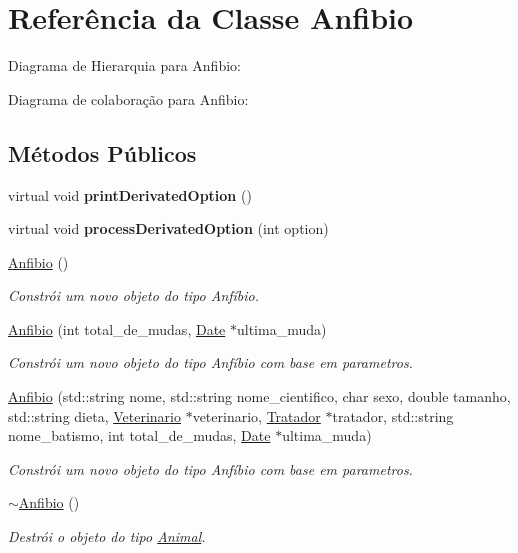 \hypertarget{classAnfibio}{}\section{Referência da Classe Anfibio}
\label{classAnfibio}


Diagrama de Hierarquia para Anfibio\+:


Diagrama de colaboração para Anfibio\+:
\subsection*{Métodos Públicos}
\begin{DoxyCompactItemize}
\item 
\mbox{\label{classAnfibio_a4d20140ce2e935fb8ac608b2c2004f3f}} 
virtual void {\bfseries print\+Derivated\+Option} ()
\item 
\mbox{\label{classAnfibio_af29dedd2429e4773b73bd01d29b33609}} 
virtual void {\bfseries process\+Derivated\+Option} (int option)
\item 
\mbox{\label{classAnfibio_a91fd9b91b9124ab41ea9e9c9bb013476}} 
\hyperlink{classAnfibio_a91fd9b91b9124ab41ea9e9c9bb013476}{Anfibio} ()
\begin{DoxyCompactList}\small\item\em Constrói um novo objeto do tipo Anfíbio. \end{DoxyCompactList}\item 
\hyperlink{classAnfibio_a488a2d9bfe450ebd8f0a19c5ec4eea32}{Anfibio} (int total\+\_\+de\+\_\+mudas, \hyperlink{classDate}{Date} $\ast$ultima\+\_\+muda)
\begin{DoxyCompactList}\small\item\em Constrói um novo objeto do tipo Anfíbio com base em parametros. \end{DoxyCompactList}\item 
\hyperlink{classAnfibio_a8b72864faa207bd6e39c29bfc8559c02}{Anfibio} (std\+::string nome, std\+::string nome\+\_\+cientifico, char sexo, double tamanho, std\+::string dieta, \hyperlink{classVeterinario}{Veterinario} $\ast$veterinario, \hyperlink{classTratador}{Tratador} $\ast$tratador, std\+::string nome\+\_\+batismo, int total\+\_\+de\+\_\+mudas, \hyperlink{classDate}{Date} $\ast$ultima\+\_\+muda)
\begin{DoxyCompactList}\small\item\em Constrói um novo objeto do tipo Anfíbio com base em parametros. \end{DoxyCompactList}\item 
\mbox{\label{classAnfibio_a53bb71a1ed0e79c5fc41a62a0af9060c}} 
\hyperlink{classAnfibio_a53bb71a1ed0e79c5fc41a62a0af9060c}{$\sim$\+Anfibio} ()
\begin{DoxyCompactList}\small\item\em Destrói o objeto do tipo \hyperlink{classAnimal}{Animal}. \end{DoxyCompactList}\end{DoxyCompactItemize}
